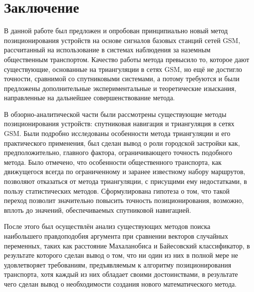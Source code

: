 
\chapter*{Заключение}

В данной работе был предложен и опробован принципиально новый метод позиционирования устройств на основе сигналов базовых станций сетей GSM, рассчитанный на использование в системах наблюдения за наземным общественным транспортом. Качество работы метода превысило то, которое дают существующие, основанные на триангуляции в сетях GSM, но ещё не достигло точности, сравнимой со спутниковыми системами, а потому требуются и были предложены дополнительные экспериментальные и теоретические изыскания, направленные на дальнейшее совершенствование метода.

В обзорно-аналитической части были рассмотрены существующие методы позиционирования устройств: спутниковая навигация и триангуляция в сетях GSM. Были подробно исследованы особенности метода триангуляции и его практического применения, был сделан вывод о роли городской застройки как, предположительно, главного фактора, ограничивающего точность подобного метода. Было отмечено, что особенности общественного транспорта, как движущегося всегда по ограниченному и заранее известному набору маршрутов, позволяют отказаться от метода триангуляции, с присущими ему недостатками, в пользу статистических методов. Сформулирована гипотеза о том, что такой переход позволит значительно повысить точность позиционирования, возможно, вплоть до значений, обеспечиваемых спутниковой навигацией.

После этого был осуществлён анализ существующих методов поиска наибольшего правдоподобия аргумента при сравнении векторов случайных переменных, таких как расстояние Махаланобиса и Байесовский классификатор, в результате которого сделан вывод о том, что ни один из них в полной мере не удовлетворяет требованиям, предъявляемым к алгоритму позиционирования транспорта, хотя каждый из них обладает своими достоинствами, в результате чего сделан вывод о необходимости создания нового математического метода.

